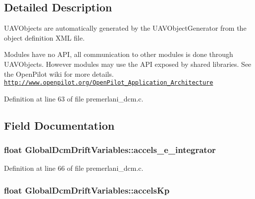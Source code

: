 \subsection{Detailed Description}
U\-A\-V\-Objects are automatically generated by the U\-A\-V\-Object\-Generator from the object definition X\-M\-L file.

Modules have no A\-P\-I, all communication to other modules is done through U\-A\-V\-Objects. However modules may use the A\-P\-I exposed by shared libraries. See the Open\-Pilot wiki for more details. \href{http://www.openpilot.org/OpenPilot_Application_Architecture}{\tt http\-://www.\-openpilot.\-org/\-Open\-Pilot\-\_\-\-Application\-\_\-\-Architecture} 

Definition at line 63 of file premerlani\-\_\-dcm.\-c.



\subsection{Field Documentation}
\hypertarget{struct_global_dcm_drift_variables_aacbe312b74443ac8368010f90278706e}{
\subsubsection[{accels\-\_\-e\-\_\-integrator}]{\setlength{\rightskip}{0pt plus 5cm}float Global\-Dcm\-Drift\-Variables\-::accels\-\_\-e\-\_\-integrator}}\label{struct_global_dcm_drift_variables_aacbe312b74443ac8368010f90278706e}


Definition at line 66 of file premerlani\-\_\-dcm.\-c.

\hypertarget{struct_global_dcm_drift_variables_a72471dea4e93a3fa653ba73556b61990}{
\subsubsection[{accels\-Kp}]{\setlength{\rightskip}{0pt plus 5cm}float Global\-Dcm\-Drift\-Variables\-::accels\-Kp}}\label{struct_global_dcm_drift_variables_a72471dea4e93a3fa653ba73556b61990}


